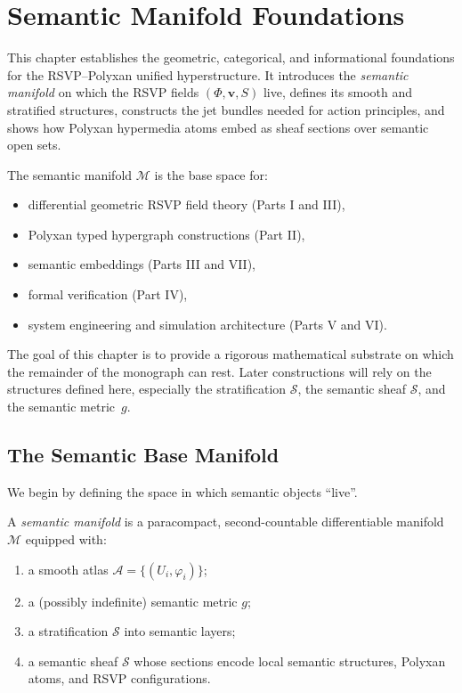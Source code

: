 \chapter{Semantic Manifold Foundations}
\label{ch:semantic-manifold}

This chapter establishes the geometric, categorical, and informational
foundations for the RSVP--Polyxan unified hyperstructure. It introduces the
\emph{semantic manifold} on which the RSVP fields $(\Phi,\mathbf{v},S)$ live,
defines its smooth and stratified structures, constructs the jet bundles needed
for action principles, and shows how Polyxan hypermedia atoms embed as sheaf
sections over semantic open sets.

The semantic manifold $\mathcal{M}$ is the base space for:
\begin{itemize}[leftmargin=2em]
  \item differential geometric RSVP field theory (Parts I and III),
  \item Polyxan typed hypergraph constructions (Part II),
  \item semantic embeddings (Parts III and VII),
  \item formal verification (Part IV),
  \item system engineering and simulation architecture (Parts V and VI).
\end{itemize}

The goal of this chapter is to provide a rigorous mathematical substrate on
which the remainder of the monograph can rest. Later constructions will rely
on the structures defined here, especially the stratification $\mathcal{S}$,
the semantic sheaf $\mathscr{S}$, and the semantic metric~$g$.

\section{The Semantic Base Manifold}

We begin by defining the space in which semantic objects ``live''.

\begin{definition}
A \emph{semantic manifold} is a paracompact, second-countable differentiable
manifold $\mathcal{M}$ equipped with:
\begin{enumerate}
  \item a smooth atlas $\mathcal{A} = \{(U_i,\varphi_i)\}$;
  \item a (possibly indefinite) semantic metric $g$;
  \item a stratification $\mathcal{S}$ into semantic layers;
  \item a semantic sheaf $\mathscr{S}$ whose sections encode local semantic
        structures, Polyxan atoms, and RSVP configurations.
\end{enumerate}
\end{definition}

